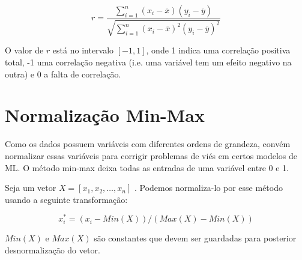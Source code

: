 \[ r = \frac{{}\sum_{i=1}^{n} (x_i - \overline{x})(y_i - \overline{y})}
  {\sqrt{\sum_{i=1}^{n} (x_i - \overline{x})^2(y_i - \overline{y})^2}} \] 


O valor de $r$ está no intervalo $[-1,1]$, onde 1 indica uma correlação positiva
total, -1 uma correlação negativa (i.e. uma variável tem um efeito negativo na
outra) e 0 a falta de correlação.


\section{Normalização Min-Max}

Como os dados possuem variáveis com diferentes ordens de grandeza, convém
normalizar essas variáveis para corrigir problemas de viés em certos modelos de
ML. O método min-max deixa todas as entradas de uma variável entre 0 e 1.

Seja um vetor $X =[x_1,x_2,\dots,x_n]$ . Podemos normaliza-lo por esse método usando a
seguinte transformação:

\[
  x^*_{i} = ( x_i - Min(X))/(Max(X) - Min(X)) 
\]

$Min(X)$  e $Max(X)$ são constantes que devem ser guardadas para posterior
desnormalização do vetor.



